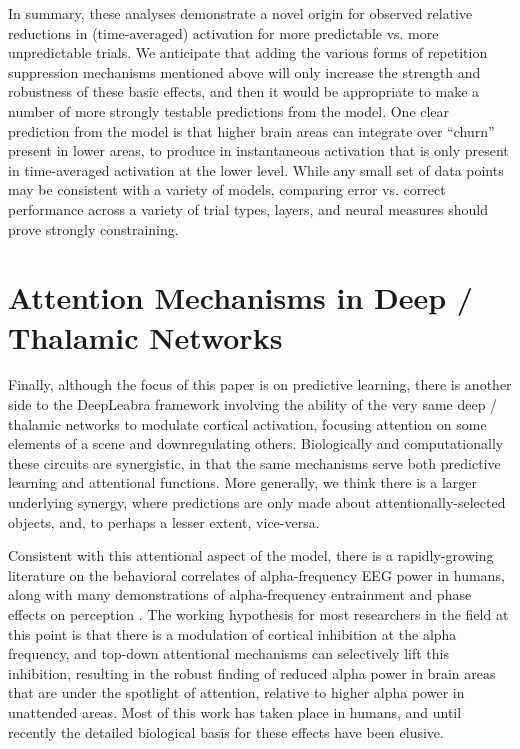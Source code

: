 \documentclass[11pt,twoside]{article}
\newif\myifpdf
\begin{document}
In summary, these analyses demonstrate a novel origin for observed relative reductions in (time-averaged) activation for more predictable vs. more unpredictable trials.  We anticipate that adding the various forms of repetition suppression mechanisms mentioned above will only increase the strength and robustness of these basic effects, and then it would be appropriate to make a number of more strongly testable predictions from the model.  One clear prediction from the model is that higher brain areas can integrate over ``churn'' present in lower areas, to produce in instantaneous activation that is only present in time-averaged activation at the lower level.  While any small set of data points may be consistent with a variety of models, comparing error vs. correct performance across a variety of trial types, layers, and neural measures should prove strongly constraining.

\section{Attention Mechanisms in Deep / Thalamic Networks}

Finally, although the focus of this paper is on predictive learning, there is another side to the DeepLeabra framework involving the ability of the very same deep / thalamic networks to modulate cortical activation, focusing attention on some elements of a scene and downregulating others.  Biologically and computationally these circuits are synergistic, in that the same mechanisms serve both predictive learning and attentional functions.  More generally, we think there is a larger underlying synergy, where predictions are only made about attentionally-selected objects, and, to perhaps a lesser extent, vice-versa. 

Consistent with this attentional aspect of the model, there is a rapidly-growing literature on the behavioral correlates of alpha-frequency EEG power in humans, along with many demonstrations of alpha-frequency entrainment and phase effects on perception \cite{NunnOsselton74,VarelaToroJohnEtAl81,VanRullenKoch03,KlimeschSausengHanslmayr07,BuschDuboisVanRullen09,MathewsonFabianiGrattonEtAl10,JensenMazaheri10,VanrullenDubois11,PalvaPalva11,RohenkohlNobre11,JensenBonnefondVanRullen12,JensenGipsBergmannEtAl14,SamahaBauerCimaroliEtAl15}.  The working hypothesis for most researchers in the field at this point is that there is a modulation of cortical inhibition at the alpha frequency, and top-down attentional mechanisms can selectively lift this inhibition, resulting in the robust finding of reduced alpha power in brain areas that are under the spotlight of attention, relative to higher alpha power in unattended areas.  Most of this work has taken place in humans, and until recently the detailed biological basis for these effects have been elusive.
\end{document}
